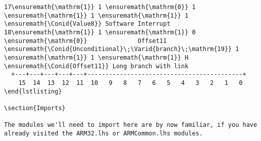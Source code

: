 \documentclass{article}
\newcommand{\Conid}[1]{\mathit{#1}}
\newcommand{\Varid}[1]{\mathit{#1}}
\begin{document}
\begin{Verbatim}[fontsize=\scriptsize]
17\ensuremath{\mathrm{1}} 1 \ensuremath{\mathrm{0}} 1 \ensuremath{\mathrm{1}} 1 \ensuremath{\mathrm{1}} 1 \ensuremath{\Conid{Value8}} Software Interrupt
18\ensuremath{\mathrm{1}} 1 \ensuremath{\mathrm{1}} 0 \ensuremath{\mathrm{0}}              Offset11                     \ensuremath{\Conid{Unconditional}\;\Varid{branch}\;\mathrm{19}} 1 \ensuremath{\mathrm{1}} 1 \ensuremath{\mathrm{1}} H \ensuremath{\Conid{Offset11}} Long branch with link
  +---+---+---+---+---+-------------------------------------------+
    15  14  13  12  11  10   9   8   7   6   5   4   3   2   1   0
\end{lstlisting}

\section{Imports}

The modules we'll need to import here are by now familiar, if you have already visited the ARM32.lhs or ARMCommon.lhs modules.


\end{Verbatim}
\end{document}

